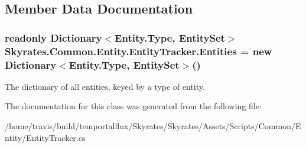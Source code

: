 \subsection{Member Data Documentation}
\hypertarget{class_skyrates_1_1_common_1_1_entity_1_1_entity_tracker_a49ba7b0d14273f75cc16639d929e41b6}{
\subsubsection[{Entities}]{\setlength{\rightskip}{0pt plus 5cm}readonly Dictionary$<$Entity.\-Type, {\bf Entity\-Set}$>$ Skyrates.\-Common.\-Entity.\-Entity\-Tracker.\-Entities = new Dictionary$<$Entity.\-Type, {\bf Entity\-Set}$>$()}}\label{class_skyrates_1_1_common_1_1_entity_1_1_entity_tracker_a49ba7b0d14273f75cc16639d929e41b6}


The dictionary of all entities, keyed by a type of entity. 



The documentation for this class was generated from the following file\-:\begin{DoxyCompactItemize}
\item 
/home/travis/build/temportalflux/\-Skyrates/\-Skyrates/\-Assets/\-Scripts/\-Common/\-Entity/Entity\-Tracker.\-cs\end{DoxyCompactItemize}
